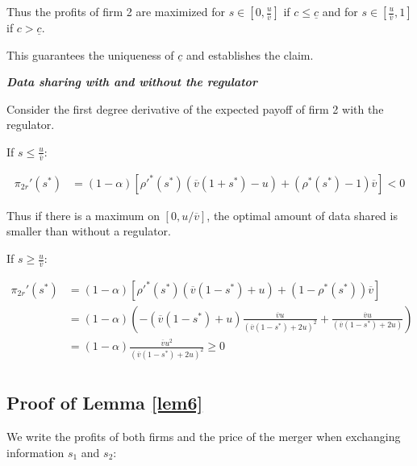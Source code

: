 \documentclass[a4paper,leqno]{article}%
\renewcommand{\a}{\alpha}
\newcommand{\ov}{\overline{v}}
\begin{document}
\medskip

Thus the profits of firm 2 are maximized for $s\in[0,\frac{u}{\ov}]$ if $c\leq \underline{c}$ and for $s\in[\frac{u}{\ov},1]$ if $c>\underline{c}$.

\medskip

This guarantees the uniqueness of $\underline{c}$ and establishes the claim.

\medskip

\textbf{\textit{Data sharing with and without the regulator}}

Consider the first degree derivative of the expected payoff of firm 2 with the regulator.

If $s\leq\frac{u}{\ov}$:

\begin{equation}
    \begin{aligned}
\pi_{2r}'(s^*)&=(1-\a)[\rho'^*(s^*)(\ov(1+s^*)-u)+(\rho^*(s^*)-1)\ov]< 0
    \end{aligned}
\end{equation}

Thus if there is a maximum on $[0,u/\ov]$, the optimal amount of data shared is smaller than without a regulator.

\bigskip

If $s\geq\frac{u}{\ov}$:

\begin{equation}
    \begin{aligned}
\pi_{2r}'(s^*)&=(1-\a)[\rho'^*(s^*)(\ov(1-s^*)+u)+(1-\rho^*(s^*))\ov]\\
            &=(1-\a)\left(-(\ov(1-s^*)+u)\frac{\ov u}{(\ov(1-s^*)+2u)^2}+\frac{\ov u}{(\ov(1-s^*)+2u)}\right)\\
            &=(1-\a)\frac{\ov u^2}{(\ov(1-s^*)+2u)^2}\geq0\\
\end{aligned}
\end{equation}


\subsection{Proof of Lemma \ref{lem6}}\label{lem6p}

We write the profits of both firms and the price of the merger when exchanging information $s_1$ and $s_2$:
\end{document}
